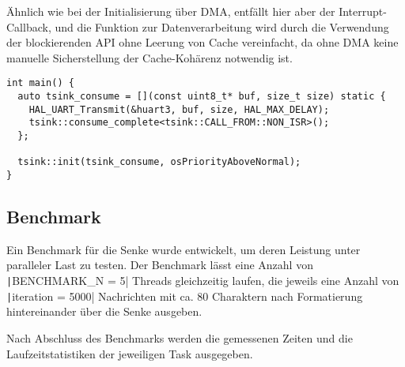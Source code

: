 Ähnlich wie bei der Initialisierung über DMA, entfällt hier aber der
Interrupt-Callback, und die Funktion zur Datenverarbeitung wird durch die
Verwendung der blockierenden API ohne Leerung von Cache vereinfacht, da ohne DMA
keine manuelle Sicherstellung der Cache-Kohärenz notwendig ist.

\begin{code}
\begin{verbatim}
int main() {
  auto tsink_consume = [](const uint8_t* buf, size_t size) static {
    HAL_UART_Transmit(&huart3, buf, size, HAL_MAX_DELAY);
    tsink::consume_complete<tsink::CALL_FROM::NON_ISR>();
  };

  tsink::init(tsink_consume, osPriorityAboveNormal);
}
\end{verbatim}
\end{code}

\subsection{Benchmark}

Ein Benchmark für die Senke wurde entwickelt, um deren Leistung unter paralleler
Last zu testen. Der Benchmark lässt eine Anzahl von
\texttt|BENCHMARK_N = 5| Threads gleichzeitig laufen, die jeweils eine
Anzahl von \texttt|iteration = 5000| Nachrichten mit ca. 80 Charaktern
nach Formatierung hintereinander über die Senke ausgeben.

Nach Abschluss des Benchmarks werden die gemessenen Zeiten und die
Laufzeitstatistiken der jeweiligen Task ausgegeben.

